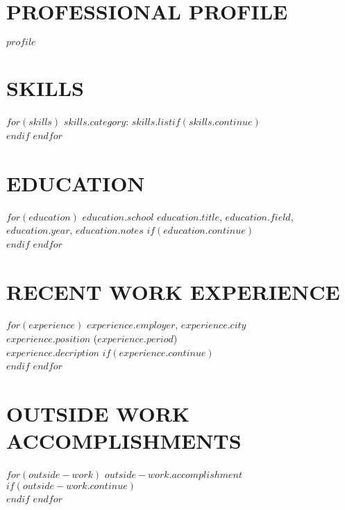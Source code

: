 \documentclass[a4paper, line, 11pt]{res} %
\begin{document}
 
 
\address{$if(contact.address)$$contact.address$\\$endif$$if(contact.telephone)$Tel: $contact.telephone$$endif$}        
\address{$if(contact.email)$E-mail: $contact.email$$endif$$if(contact.url)$\\ URL: $contact.url$$endif$$if(contact.extra)$$contact.extra$$endif$}
  
                        
\begin{resume}                         
 
\section{PROFESSIONAL PROFILE}  
  $profile$ 

\section{SKILLS}  

$for(skills)$
    \textbf{$skills.category$}: $skills.list$$if(skills.continue)$\\$endif$
$endfor$

\section{EDUCATION} 

$for(education)$
    \uppercase{$education.school$} \emph{$education.title$}, $education.field$, $education.year$, $education.notes$ $if(education.continue)$\\$endif$
$endfor$

  

\section{RECENT WORK EXPERIENCE}
$for(experience)$
    \textbf{\uppercase{$experience.employer$}}, $experience.city$ \\ \emph{$experience.position$} ($experience.period$)\\ $experience.decription$ $if(experience.continue)$\\$endif$
$endfor$


\section{OUTSIDE WORK ACCOMPLISHMENTS}  


$for(outside-work)$
    $outside-work.accomplishment$$if(outside-work.continue)$\\$endif$
$endfor$

\end{resume}
\end{document}
